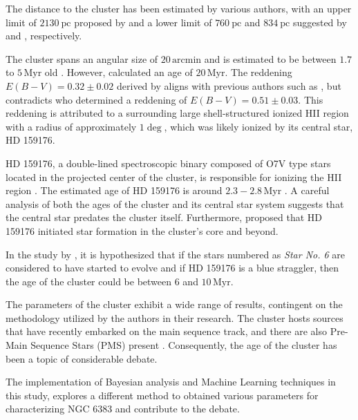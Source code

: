 \documentclass[fleqn,usenatbib,usedcolumn,useAMS]{mnras}
\begin{document}
The distance to the cluster has been estimated by various authors, with an upper limit of $2130 ~\mathrm{pc}$ proposed by \cite{1930LicOB..14..154T} and a lower limit of $760~\mathrm{pc}$ and $834~\mathrm{pc}$ suggested by \cite{1949ApJ...110..117S} and \cite{2018AA...610A..30A}, respectively.

 The cluster spans an angular size of $20\,\textrm{arcmin}$ \citep{2013A&A...560A..76M} and is estimated to be between $1.7$ to $5\,\textrm{Myr}$ old \citep{1978MNRAS.182..607F,1989MNRAS.236..263P,1991MNRAS.249...76B,2005AA...438.1163K,2007AA...462..157P}. However, \citet{1968ArA.....5....1L} calculated an age of $20\,\textrm{Myr}$. The reddening $E(B-V) = 0.32 \pm 0.02$ derived by \citet{2008hsf2.book..497R} aligns with previous authors such as \citet{1971AAS....4..241B,1978MNRAS.182..607F,1978MNRAS.184..661L,1985AA...151..391T,1989MNRAS.236..263P,1994RMxAA..29..141F,2007AA...462..157P}, but contradicts \citet{2018AA...610A..30A} who determined a reddening of $E(B-V) = 0.51 \pm 0.03$. This reddening is attributed to a surrounding large shell-structured ionized HII region with a radius of approximately $1\deg$, which was likely ionized by its central star, HD 159176.
 
HD 159176, a double-lined spectroscopic binary composed of O7V type stars located in the projected center of the cluster, is responsible for ionizing the HII region \citep{2016ApJ...832..211P}. The estimated age of HD 159176 is around $2.3-2.8$\,\textrm{Myr} \citep{2010AA...511A..25R}. A careful analysis of both the ages of the cluster and its central star system suggests that the central star predates the cluster itself. Furthermore, \citet{1978MNRAS.182..607F} proposed that HD 159176 initiated star formation in the cluster's core and beyond.

In the study by \citet{2018AA...610A..30A}, it is hypothesized that if the stars numbered as \textit{Star No. 6} are considered to have started to evolve and if HD 159176 is a blue straggler, then the age of the cluster could be between $6$ and $10\,\textrm{Myr}$.

The parameters of the cluster exhibit a wide range of results, contingent on the methodology utilized by the authors in their research. The cluster hosts sources that have recently embarked on the main sequence track, and there are also Pre-Main Sequence Stars (PMS) present \citet{2019MNRAS.484.5102K}. Consequently, the age of the cluster has been a topic of considerable debate.

The implementation of Bayesian analysis and Machine Learning techniques in this study, explores a different method to obtained various parameters for characterizing NGC 6383 and contribute to the debate.
\end{document}
